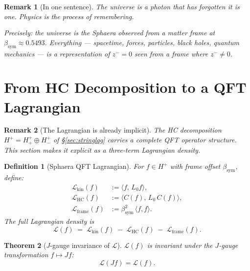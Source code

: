 \documentclass[12pt,a4paper]{article}
\newtheorem{theorem}{Theorem}[section]
\newtheorem{definition}[theorem]{Definition}
\newtheorem*{remark}{Remark}
\newcommand{\bsym}{\beta_{\mathrm{sym}}}
\newcommand{\zminus}{z^-}
\newcommand{\Hplus}{H^+}
\newcommand{\Hplusplus}{H^+_+}
\newcommand{\Hplusminus}{H^+_-}
\begin{document}
\begin{remark}[In one sentence]
The universe is a photon that has forgotten it is one. Physics is the
process of remembering.

Precisely: the universe is the Sphaera observed from a matter frame at
$\bsym\approx 0.5493$. Everything --- spacetime, forces, particles,
black holes, quantum mechanics --- is a representation of $\zminus=0$
seen from a frame where $\zminus\neq 0$.
\end{remark}



\section{From HC Decomposition to a QFT Lagrangian}
\label{sec:lagrangian}

\begin{remark}[The Lagrangian is already implicit]
The HC decomposition $\Hplus=\Hplusplus\oplus\Hplusminus$ of \S\ref{sec:stringlqg}
carries a complete QFT operator structure.
This section makes it explicit as a three-term Lagrangian density.
\end{remark}

\begin{definition}[Sphaera QFT Lagrangian]\label{def:lagrangian}
For $f\in\Hplus$ with frame offset $\bsym$, define:
\begin{align}
  \mathcal{L}_{\mathrm{kin}}(f)
    &:= \langle f,\,L_0 f\rangle,\label{eq:L_kin}\\
  \mathcal{L}_{\mathrm{HC}}(f)
    &:= \langle C(f),\,L_0\,C(f)\rangle,\label{eq:L_HC}\\
  \mathcal{L}_{\mathrm{frame}}(f)
    &:= \bsym^2\,\langle f,f\rangle.\label{eq:L_frame}
\end{align}
The full Lagrangian density is
\[
  \mathcal{L}(f)
  \;=\;
  \mathcal{L}_{\mathrm{kin}}(f)
  \;-\;
  \mathcal{L}_{\mathrm{HC}}(f)
  \;-\;
  \mathcal{L}_{\mathrm{frame}}(f).
\]
\end{definition}

\begin{theorem}[$J$-gauge invariance of $\mathcal{L}$]\label{thm:gauge-invariance}
$\mathcal{L}(f)$ is invariant under the $J$-gauge transformation
$f\mapsto Jf$:
\[
  \mathcal{L}(Jf) = \mathcal{L}(f).
\]
\end{theorem}
\end{document}
